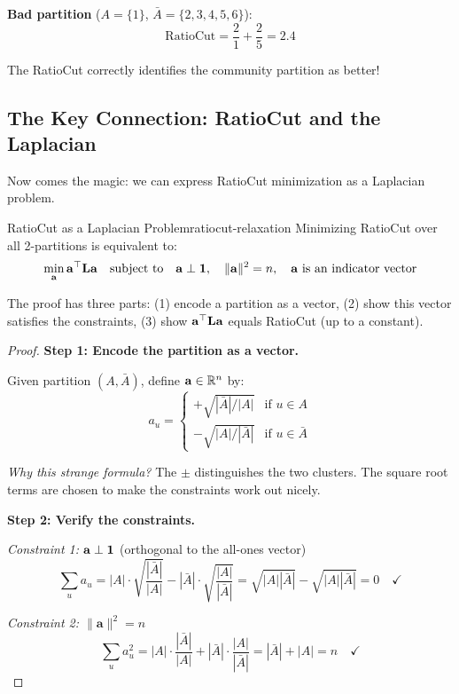 \begin{notechapter}
\begin{example}
\textbf{Bad partition} ($A = \{1\}$, $\bar{A} = \{2,3,4,5,6\}$):
\[
\text{RatioCut} = \frac{2}{1} + \frac{2}{5} = 2.4
\]

The RatioCut correctly identifies the community partition as better!
\end{example}

\subsection{The Key Connection: RatioCut and the Laplacian}

Now comes the magic: we can express RatioCut minimization as a Laplacian problem.

\begin{theorem}{RatioCut as a Laplacian Problem}{ratiocut-relaxation}
Minimizing RatioCut over all 2-partitions is equivalent to:
\begin{equation}
\min_{\mathbf{a}} \mathbf{a}^\top \mathbf{L} \mathbf{a} \quad \text{subject to} \quad \mathbf{a} \perp \mathbf{1}, \quad \|\mathbf{a}\|^2 = n, \quad \mathbf{a} \text{ is an indicator vector}
\end{equation}
\end{theorem}

The proof has three parts: (1) encode a partition as a vector, (2) show this vector satisfies the constraints, (3) show $\mathbf{a}^\top \mathbf{L} \mathbf{a}$ equals RatioCut (up to a constant).

\begin{proof}
\textbf{Step 1: Encode the partition as a vector.}

Given partition $(A, \bar{A})$, define $\mathbf{a} \in \mathbb{R}^n$ by:
\[
a_u = \begin{cases} +\sqrt{|\bar{A}|/|A|}  & \text{if } u \in A \\[4pt] -\sqrt{|A|/|\bar{A}|} & \text{if } u \in \bar{A} \end{cases}
\]

\textit{Why this strange formula?} The $\pm$ distinguishes the two clusters. The square root terms are chosen to make the constraints work out nicely.

\textbf{Step 2: Verify the constraints.}

\textit{Constraint 1: $\mathbf{a} \perp \mathbf{1}$} (orthogonal to the all-ones vector)
\[
\sum_{u} a_u = |A| \cdot \sqrt{\frac{|\bar{A}|}{|A|}} - |\bar{A}| \cdot \sqrt{\frac{|A|}{|\bar{A}|}} = \sqrt{|A||\bar{A}|} - \sqrt{|A||\bar{A}|} = 0 \quad \checkmark
\]

\textit{Constraint 2: $\|\mathbf{a}\|^2 = n$}
\[
\sum_{u} a_u^2 = |A| \cdot \frac{|\bar{A}|}{|A|} + |\bar{A}| \cdot \frac{|A|}{|\bar{A}|} = |\bar{A}| + |A| = n \quad \checkmark
\]


\end{proof}
\end{notechapter}

